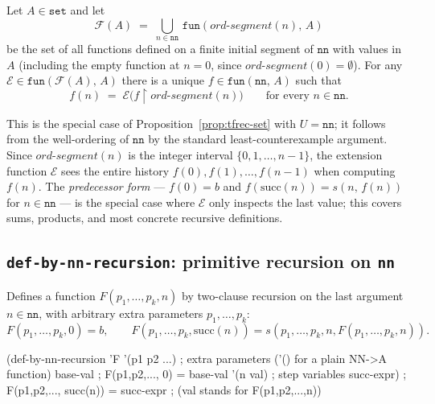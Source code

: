 \begin{prop}\label{prop:nn-rec}
Let $A \in \mathtt{set}$ and let
\[
  \mathcal{F}(A) \;=\; \bigcup_{n \in \mathtt{nn}}\,\mathtt{fun}(\mathit{ord\text{-}segment}(n),\, A)
\]
be the set of all functions defined on a finite initial segment of $\mathtt{nn}$
with values in $A$ (including the empty function at $n = 0$, since
$\mathit{ord\text{-}segment}(0) = \emptyset$).
For any $\mathcal{E} \in \mathtt{fun}(\mathcal{F}(A),\, A)$ there is a unique
$f \in \mathtt{fun}(\mathtt{nn},\, A)$ such that
\[
  f(n) \;=\; \mathcal{E}\!\bigl(f \!\restriction\! \mathit{ord\text{-}segment}(n)\bigr)
  \qquad \text{for every } n \in \mathtt{nn}.
\]
\end{prop}

\begin{remark}
This is the special case of Proposition~\ref{prop:tfrec-set} with
$U = \mathtt{nn}$; it follows from the well-ordering of $\mathtt{nn}$ by the
standard least-counterexample argument.
Since $\mathit{ord\text{-}segment}(n)$ is the integer interval $\{0, 1, \ldots, n-1\}$,
the extension function $\mathcal{E}$ sees the entire history
$f(0), f(1), \ldots, f(n-1)$ when computing $f(n)$.
The \emph{predecessor form} --- $f(0) = b$ and
$f(\mathrm{succ}(n)) = s(n,\, f(n))$ for $n \in \mathtt{nn}$ --- is the special case
where $\mathcal{E}$ only inspects the last value; this covers sums, products,
and most concrete recursive definitions.
\end{remark}

\subsection{\texttt{def-by-nn-recursion}: primitive recursion on \texttt{nn}}

Defines a function $F(p_1, \ldots, p_k, n)$ by two-clause recursion on the
last argument $n \in \mathtt{nn}$, with arbitrary extra parameters
$p_1, \ldots, p_k$:
\[
  F(p_1,\ldots,p_k,0) = b, \qquad
  F(p_1,\ldots,p_k,\mathrm{succ}(n)) = s(p_1,\ldots,p_k,n,F(p_1,\ldots,p_k,n)).
\]

\begin{VNBcode}
(def-by-nn-recursion 'F
  '(p1 p2 ...)      ; extra parameters ('() for a plain NN->A function)
  base-val          ; F(p1,p2,..., 0) = base-val
  '(n val)          ; step variables
  succ-expr)        ; F(p1,p2,..., succ(n)) = succ-expr
                    ;   (val stands for F(p1,p2,...,n))
\end{VNBcode}

